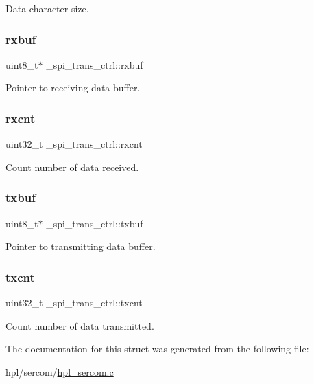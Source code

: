 Data character size. \mbox{\label{struct__spi__trans__ctrl_a27e27d3226399d90a8f4a4c9580d1b20}} 
\subsubsection{\texorpdfstring{rxbuf}{rxbuf}}
{\footnotesize\ttfamily uint8\+\_\+t$\ast$ \+\_\+spi\+\_\+trans\+\_\+ctrl\+::rxbuf}

Pointer to receiving data buffer. \mbox{\label{struct__spi__trans__ctrl_aa7b3bb5420e55e627e0670491b7dfdb3}} 
\subsubsection{\texorpdfstring{rxcnt}{rxcnt}}
{\footnotesize\ttfamily uint32\+\_\+t \+\_\+spi\+\_\+trans\+\_\+ctrl\+::rxcnt}

Count number of data received. \mbox{\label{struct__spi__trans__ctrl_a31fcb8257bb47b3f5f556e73a75488b8}} 
\subsubsection{\texorpdfstring{txbuf}{txbuf}}
{\footnotesize\ttfamily uint8\+\_\+t$\ast$ \+\_\+spi\+\_\+trans\+\_\+ctrl\+::txbuf}

Pointer to transmitting data buffer. \mbox{\label{struct__spi__trans__ctrl_ac2a7e7b24c384608823b1969dd9650ab}} 
\subsubsection{\texorpdfstring{txcnt}{txcnt}}
{\footnotesize\ttfamily uint32\+\_\+t \+\_\+spi\+\_\+trans\+\_\+ctrl\+::txcnt}

Count number of data transmitted. 

The documentation for this struct was generated from the following file\+:\begin{DoxyCompactItemize}
\item 
hpl/sercom/\hyperlink{hpl__sercom_8c}{hpl\+\_\+sercom.\+c}\end{DoxyCompactItemize}
